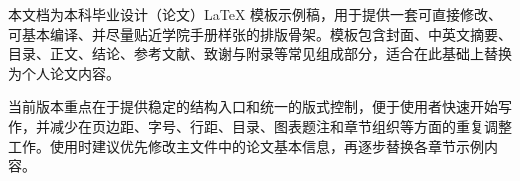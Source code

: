 \begin{cnabstract}
本文档为本科毕业设计（论文）LaTeX 模板示例稿，用于提供一套可直接修改、可基本编译、并尽量贴近学院手册样张的排版骨架。模板包含封面、中英文摘要、目录、正文、结论、参考文献、致谢与附录等常见组成部分，适合在此基础上替换为个人论文内容。

当前版本重点在于提供稳定的结构入口和统一的版式控制，便于使用者快速开始写作，并减少在页边距、字号、行距、目录、图表题注和章节组织等方面的重复调整工作。使用时建议优先修改主文件中的论文基本信息，再逐步替换各章节示例内容。
\end{cnabstract}
